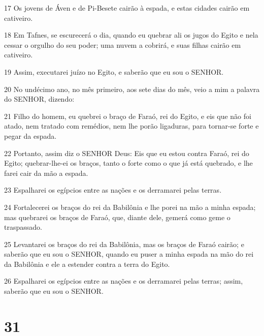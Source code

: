 \par 17 Os jovens de Áven e de Pi-Besete cairão à espada, e estas cidades cairão em cativeiro.
\par 18 Em Tafnes, se escurecerá o dia, quando eu quebrar ali os jugos do Egito e nela cessar o orgulho do seu poder; uma nuvem a cobrirá, e suas filhas cairão em cativeiro.
\par 19 Assim, executarei juízo no Egito, e saberão que eu sou o SENHOR.
\par 20 No undécimo ano, no mês primeiro, aos sete dias do mês, veio a mim a palavra do SENHOR, dizendo:
\par 21 Filho do homem, eu quebrei o braço de Faraó, rei do Egito, e eis que não foi atado, nem tratado com remédios, nem lhe porão ligaduras, para tornar-se forte e pegar da espada.
\par 22 Portanto, assim diz o SENHOR Deus: Eis que eu estou contra Faraó, rei do Egito; quebrar-lhe-ei os braços, tanto o forte como o que já está quebrado, e lhe farei cair da mão a espada.
\par 23 Espalharei os egípcios entre as nações e os derramarei pelas terras.
\par 24 Fortalecerei os braços do rei da Babilônia e lhe porei na mão a minha espada; mas quebrarei os braços de Faraó, que, diante dele, gemerá como geme o traspassado.
\par 25 Levantarei os braços do rei da Babilônia, mas os braços de Faraó cairão; e saberão que eu sou o SENHOR, quando eu puser a minha espada na mão do rei da Babilônia e ele a estender contra a terra do Egito.
\par 26 Espalharei os egípcios entre as nações e os derramarei pelas terras; assim, saberão que eu sou o SENHOR.

\chapter{31}


